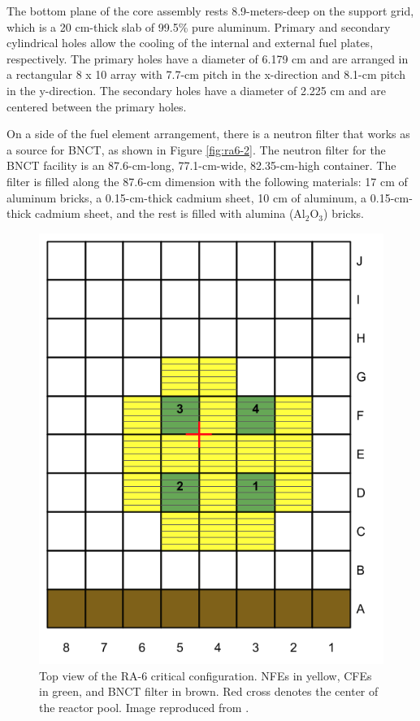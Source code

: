 \documentclass{style/nseJournal}
\begin{document}
The bottom plane of the core assembly rests 8.9-meters-deep on the support grid, which is a 20 cm-thick slab of 99.5\% pure aluminum.
Primary and secondary cylindrical holes allow the cooling of the internal and external fuel plates, respectively.
The primary holes have a diameter of 6.179 cm and are arranged in a rectangular 8 x 10 array with 7.7-cm pitch in the x-direction and 8.1-cm pitch in the y-direction.
The secondary holes have a diameter of 2.225 cm and are centered between the primary holes.

On a side of the fuel element arrangement, there is a neutron filter that works as a source for \gls*{BNCT}, as shown in Figure \ref{fig:ra6-2}.
The neutron filter for the \gls*{BNCT} facility is an 87.6-cm-long, 77.1-cm-wide, 82.35-cm-high container.
The filter is filled along the 87.6-cm dimension with the following materials: 17 cm of aluminum bricks, a 0.15-cm-thick cadmium sheet, 10 cm of aluminum, a 0.15-cm-thick cadmium sheet, and the rest is filled with alumina (Al$_2$O$_3$) bricks.

\begin{figure}[htbp!] %
    \centering
    \includegraphics[width=0.55\linewidth]{figures/ra6_core2}
    \hfill
    \caption{Top view of the RA-6 critical configuration. NFEs in yellow, CFEs in green, and BNCT filter in brown. Red cross denotes the center of the reactor pool. Image reproduced from \cite{ICSBEP}.}
    \label{fig:ra6-1}
\end{figure}
\end{document}
